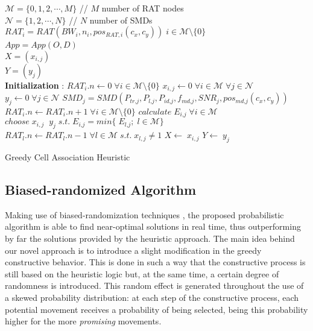 \documentclass[twoside,openright]{report}
\newenvironment{boxedalgorithmic}
{\begin{lrbox}{\ieeealgbox}
\begin{minipage}{\dimexpr\columnwidth-2\fboxsep-2\fboxrule}
\begin{algorithmic}}
{\end{algorithmic}
\end{minipage}
\end{lrbox}\noindent\fbox{\usebox{\ieeealgbox}}}
\begin{document}
\begin{algorithm}[htbp]
\begin{boxedalgorithmic}
\renewcommand{\algorithmiccomment}[1]{// #1}
\renewcommand{\algorithmicrequire}{\textbf{Inputs:}}
\renewcommand{\algorithmicensure}{\textbf{Output:}}
\REQUIRE $\,$\\
$\mathcal{M} = \{{0,1,2,\cdots, M\}}$ // $M$ number of RAT nodes \\
$\mathcal{N} = \{{1,2,\cdots, N\}}$ // $N$ number of SMDs \\
$\textit{RAT}_i = \textit{RAT}(\textit{BW}_i, n_i, pos_{RAT,i}(c_x,c_y))\;i \in \mathcal{M}\setminus \{{0\}}$ \\
\STATE $\textit{App}=\textit{App}(O,D)$
\ENSURE $\,$\\
$X = (x_{i,j})$\\  
$Y = (y_j)$ \\
\textbf{Initialization} :
\STATE $\textit{RAT}_{i}.n \leftarrow 0 \;\forall i \in \mathcal{M}\setminus \{{0\}}$
\STATE $x_{i,j} \leftarrow 0 \;\forall i \in \mathcal{M} \;\forall j \in \mathcal{N}$ 
\STATE $y_j  \leftarrow 0 \;\forall j \in \mathcal{N}$
\STATE $\textit{SMD}_j = \textit{SMD}(P_\textit{tr,j},P_\textit{l,j},P_\textit{id,j},f_\textit{md,j},\textit{SNR}_j, pos_\textit{md,j}(c_x,c_y))$
\STATE $\textit{RAT}_{i}.n \leftarrow \textit{RAT}_{i}.n+1 \;\forall i \in \mathcal{M}\setminus \{{0\}} $
\STATE $calculate\;E_\textit{i,j}\;\forall i \in \mathcal{M}$
\STATE $choose\;x_{i,j}\;\; y_j \;s.t.\;E_\textit{i,j}= min\{{\;E_\textit{l,j};\; l \in \mathcal{M}\}}$
\STATE $\textit{RAT}_{l}.n \leftarrow  \textit{RAT}_{l}.n-1 \;\forall l \in \mathcal{M}\; s.t.\; x_{l,j}\ne 1$
\STATE $X \leftarrow  \; x_{i,j}$
\STATE $Y \leftarrow  \; y_j$
\ENDFOR
\end{boxedalgorithmic}
\caption{Greedy Cell Association Heuristic}
\label{algo:ACalgo}
\end{algorithm}

\subsection{Biased-randomized Algorithm}
\label{sub:bra}
Making use of biased-randomization techniques \cite{Juan2011}, the proposed probabilistic algorithm is able to find near-optimal solutions in real time, thus outperforming by far the solutions provided by the heuristic approach. 
The main idea behind our novel approach is to introduce a slight modification in the greedy constructive behavior. 
This is done in such a way that the constructive process is still based on the heuristic logic but, at the same time, a certain degree of randomness is introduced. 
This random effect is generated throughout the use of a skewed probability distribution: at each step of the constructive process, each potential movement receives a probability of being selected, being this probability higher for the more \emph{promising} movements.
\end{document}
